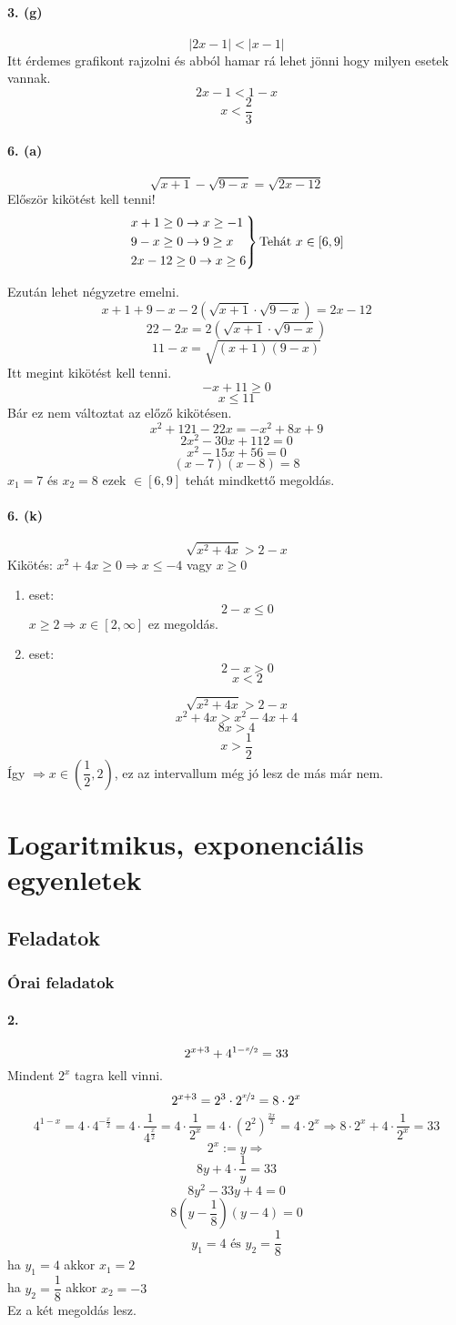 \documentclass[12pt,a4paper,fleqn]{article}
\newcommand{\myparagraph}[1]{\paragraph{#1}\mbox{}}
\begin{document}
\myparagraph{3. (g)}
\[ |2x-1| < |x-1| \]
Itt érdemes grafikont rajzolni és abból hamar rá lehet jönni hogy milyen
esetek vannak.
\[ 2x-1 < 1-x \]
\[ x < \dfrac{2}{3} \]


\myparagraph{6. (a)}
\[ \sqrt{x+1} - \sqrt{9-x} = \sqrt{2x-12} \]
Először kikötést kell tenni!
\[
\begin{rcases*}
  x+1 \geq 0 \rightarrow x \geq -1 \\
  9-x \geq 0 \rightarrow 9 \geq x \\
  2x-12 \geq 0 \rightarrow x \geq 6
\end{rcases*} \text{Tehát } x \in [6, 9]
\]

Ezután lehet négyzetre emelni.
\[ x+1+9-x-2(\sqrt{x+1} \cdot \sqrt{9-x}) = 2x-12 \]
\[ 22-2x = 2(\sqrt{x+1} \cdot \sqrt{9-x}) \]
\[ 11-x = \sqrt{(x+1)(9-x)} \]
Itt megint kikötést kell tenni.
\[ -x + 11 \geq 0 \]
\[ x \leq 11 \]
Bár ez nem változtat az előző kikötésen.
\[ x^2 + 121 - 22x = -x^2 + 8x + 9 \]
\[ 2x^2 -30x +112 = 0 \]
\[ x^2 -15x +56 = 0 \]
\[ (x-7)(x-8) = 8 \]
$ x_1 = 7 $ és $ x_2=8 $ ezek $\in [6,9]$ tehát mindkettő megoldás.


\myparagraph{6. (k)}
\[ \sqrt{x^2+4x} > 2-x \]
Kikötés: $ x^2 +4x \geq 0 \Rightarrow x \leq -4$ vagy $x \geq 0$
\begin{enumerate}
  \item eset:
    \[ 2-x \leq 0 \]
    $x \geq 2 \Rightarrow x \in [2, \infty]$ ez megoldás.
  \item eset:
    \[ 2-x > 0 \]
    \[ x < 2 \]
\end{enumerate}
\[ \sqrt{x^2+4x} > 2-x \]
\[ x^2 + 4x > x^2 - 4x +4 \]
\[ 8x > 4 \]
\[ x > \dfrac{1}{2} \]
Így $ \Rightarrow x \in \left(\dfrac{1}{2}, 2\right)$, ez az intervallum még jó
lesz de más már nem.


\section{Logaritmikus, exponenciális egyenletek}
\setcounter{subsection}{1}
\subsection{Feladatok}
\subsubsection{Órai feladatok}


\myparagraph{2.}
\[ 2^{x+3} + 4^{1-\nicefrac{x}{2}} = 33 \]
Mindent $2^x$ tagra kell vinni.
\[ 2^{x+3} = 2^3 \cdot 2^{\nicefrac{x}{2}} = 8 \cdot 2^x \]
\[ 4^{1-x} = 4 \cdot 4^{-\frac{x}{2}} = 4 \cdot \dfrac{1}{4^{\frac{x}{2}}} =
  4 \cdot \dfrac{1}{2^x} = 4 \cdot (2^2)^{\frac{2x}{2}} = 4 \cdot 2^x
    \Rightarrow 8 \cdot 2^x + 4 \cdot \dfrac{1}{2^x} = 33
\]
\[ 2^x := y \Rightarrow \]
\[ 8y + 4 \cdot \dfrac{1}{y} = 33 \]
\[ 8y^2 - 33y + 4 = 0 \]
\[ 8(y-\dfrac{1}{8})(y-4) =0 \]
\[ y_1 = 4 \text{ és } y_2 = \dfrac{1}{8} \]
ha $y_1 = 4$ akkor $x_1 = 2$ \\
ha $y_2 = \dfrac{1}{8}$ akkor $x_2 = -3$ \\
Ez a két megoldás lesz.
\end{document}
